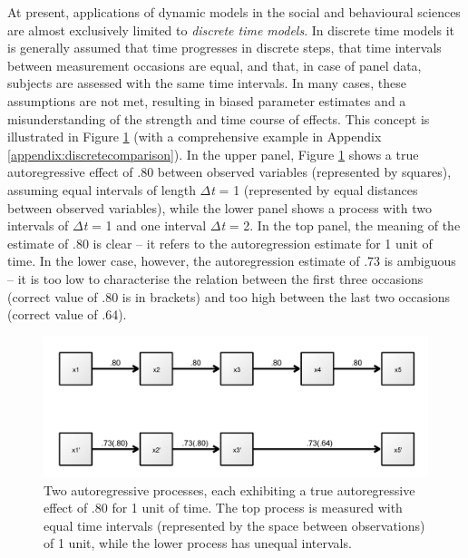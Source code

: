 \documentclass[nojss]{jss}\usepackage[]{graphicx}\usepackage[]{color}
\begin{document}
At present, applications of dynamic models in the social and behavioural sciences are almost exclusively limited to \textit{discrete time models}. In discrete time models it is generally assumed that time progresses in discrete steps, that time intervals between measurement occasions are equal, and that, in case of panel data, subjects are assessed with the same time intervals. In many cases, these assumptions are not met, resulting in biased parameter estimates and a misunderstanding of the strength and time course of effects. This concept is illustrated in Figure \ref{fig:discretecomparison} (with a comprehensive example in Appendix \ref{appendix:discretecomparison}). In the upper panel, Figure \ref{fig:discretecomparison} shows a true autoregressive effect of .80 between observed variables (represented by squares), assuming equal intervals of length $\Delta$\textit{t} = 1 (represented by equal distances between observed variables), while the lower panel shows a process with two intervals of $\Delta$\textit{t} = 1 and one interval $\Delta$\textit{t} = 2. In the top panel, the meaning of the estimate of .80 is clear -- it refers to the autoregression estimate for 1 unit of time. In the lower case, however, the autoregression estimate of .73 is ambiguous -- it is too low to characterise the relation between the first three occasions (correct value of .80 is in brackets) and too high between the last two occasions (correct value of .64). 

\begin{figure}[!h]
\centering
\includegraphics[]{pathdiagramdiscretecomparison}
\caption{ \label{fig:discretecomparison} Two autoregressive processes, each exhibiting a true autoregressive effect of .80 for 1 unit of time. The top process is measured with equal time intervals (represented by the space between observations) of 1 unit, while the lower process has unequal intervals.}
\end{figure}
\end{document}
